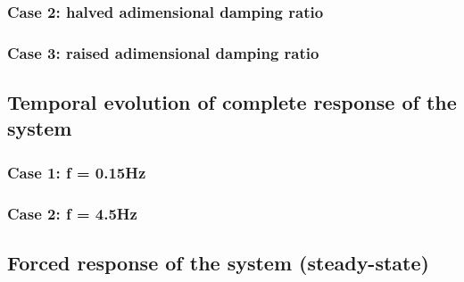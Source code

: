 \documentclass[a4paper,12pt,oneside]{article}
\begin{document}
\subsubsection*{Case 2: halved adimensional damping ratio}



\subsubsection*{Case 3: raised adimensional damping ratio}



\subsection{Temporal evolution of complete response of the system}



\subsubsection*{Case 1: f = 0.15Hz}



\subsubsection*{Case 2: f = 4.5Hz}



\subsection{Forced response of the system (steady-state)}
\end{document}
